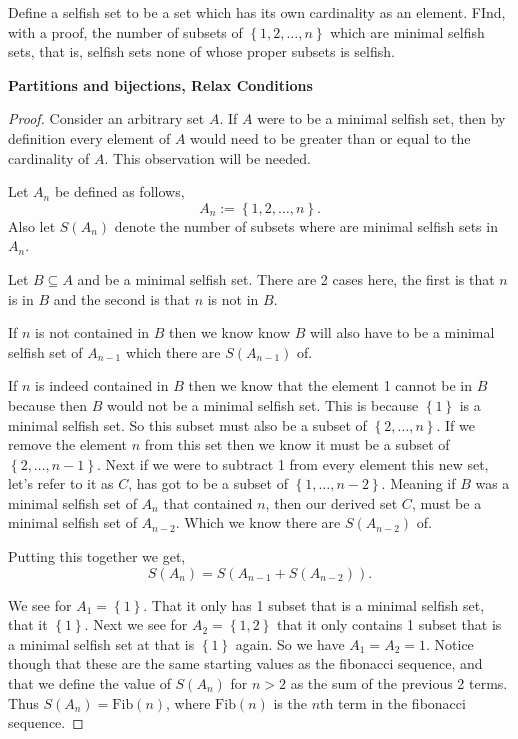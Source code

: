 \documentclass[11pt]{article}
\newenvironment{problem}[2][Problem\!]{\begin{trivlist}
\item[\hskip \labelsep {\bfseries #1}\hskip \labelsep {\bfseries #2}]}{\end{trivlist}}
\newcommand{\set}[1]{\left\{#1\right\}} %
\begin{document}
\begin{tcolorbox}
    \begin{problem}{ IC | 11/05 | 124. (Putnam)}
        Define a selfish set to be a set which has its own cardinality as an element. FInd, with a proof, the number of subsets of $\set{1,2,\dots, n}$ which are minimal selfish sets, that is, selfish sets none of whose proper subsets is selfish. 
    \end{problem}
    \textbf{Partitions and bijections, Relax Conditions}
\end{tcolorbox}
\begin{proof}
    Consider an arbitrary set $A$. If $A$ were to be a minimal selfish set, then by definition every element of $A$ would need to be greater than or equal to the cardinality of $A$. This observation will be needed. 

    Let $A_n$ be defined as follows,
    \[A_n := \set{1,2,\dots, n}.\]
    Also let $S(A_n)$ denote the number of subsets where are minimal selfish sets in $A_n$.


    Let $B \subseteq A$ and be a minimal selfish set. There are 2 cases here, the first is that $n$ is in $B$ and the second is that $n$ is not in $B$.
    
    If $n$ is not contained in $B$ then we know know $B$ will also have to be a minimal selfish set of $A_{n-1}$ which there are $S(A_{n-1})$ of. 

    If $n$ is indeed contained in $B$ then we know that the element 1 cannot be in $B$ because then $B$ would not be a minimal selfish set. This is because $\set{1}$ is a minimal selfish set. So this subset must also be a subset of $\set{2, \dots, n}$. If we remove the element $n$ from this set then we know it must be a subset of $\set{2, \dots, n-1}$. Next if we were to subtract 1 from every element this new set, let's refer to it as $C$, has got to be a subset of $\set{1,\dots,n-2}$. Meaning if $B$ was a minimal selfish set of $A_n$ that contained $n$, then our derived set $C$, must be a minimal selfish set of $A_{n-2}$. Which we know there are $S(A_{n-2})$ of. 
    
    Putting this together we get,
    \[S(A_n) = S(A_{n-1} + S(A_{n-2})).\]

    We see for $A_1 = \set{1}$. That it only has 1 subset that is a minimal selfish set, that it $\set{1}$. Next we see for $A_2 = \set{1,2}$ that it only contains 1 subset that is a minimal selfish set at that is $\set{1}$ again. So we have $A_1 = A_2 = 1$. Notice though that these are the same starting values as the fibonacci sequence, and that we define the value of $S(A_n)$ for $n > 2$ as the sum of the previous 2 terms. Thus $S(A_n) = \text{Fib}(n)$, where $\text{Fib}(n)$ is the $n$th term in the fibonacci sequence. 
\end{proof}
\end{document}
